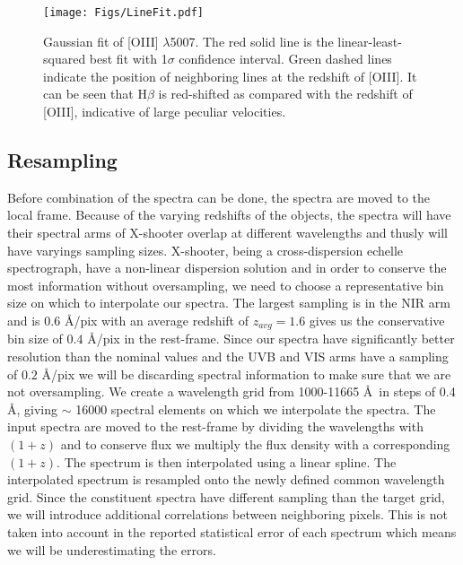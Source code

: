 \documentclass{aa}    %
\newcommand{\figlabel}[1]{\label{fig:#1}}
\newcommand{\sectlabel}[1]{\label{sect:#1}}
\begin{document}
\begin{figure}[hbtp]
  \centering
  \texttt{[image: Figs/LineFit.pdf]}
  \caption[]{Gaussian fit of [OIII] $\lambda$5007. The red solid line is the linear-least-squared best fit with 1$\sigma$ confidence interval. Green dashed lines indicate the position of neighboring lines at the redshift of [OIII]. It can be seen that H$\beta$ is red-shifted as compared with the redshift of [OIII], indicative of large peculiar velocities.}
  \figlabel{linefit}
\end{figure}

\subsection{Resampling} \sectlabel{rebin}

Before combination of the spectra can be done, the spectra are moved to the local frame. Because of the varying redshifts of the objects, the spectra will have their spectral arms of X-shooter overlap at different wavelengths and thusly will have varyings sampling sizes. X-shooter, being a cross-dispersion echelle spectrograph, have a non-linear dispersion solution and in order to conserve the most information without oversampling, we need to choose a representative bin size on which to interpolate our spectra. The largest sampling is in the NIR arm and is $0.6$ \AA/pix with an average redshift of $z_{avg} = 1.6$ gives us the conservative bin size of $0.4$ \AA/pix in the rest-frame. Since our spectra have significantly better resolution than the nominal values and the UVB and VIS arms have a sampling of $0.2$ \AA/pix we will be discarding spectral information to make sure that we are not oversampling. We create a wavelength grid from 1000-11665 \AA~in steps of 0.4 \AA, giving $\sim$ 16000 spectral elements on which we interpolate the spectra. The input spectra are moved to the rest-frame by dividing the wavelengths with $(1 + z)$ and to conserve flux we multiply the flux density with a corresponding $(1 + z)$. The spectrum is then interpolated using a linear spline. The interpolated spectrum is resampled onto the newly defined common wavelength grid. Since the constituent spectra have different sampling than the target grid, we will introduce additional correlations between neighboring pixels. This is not taken into account in the reported statistical error of each spectrum which means we will be underestimating the errors. 
\end{document}
